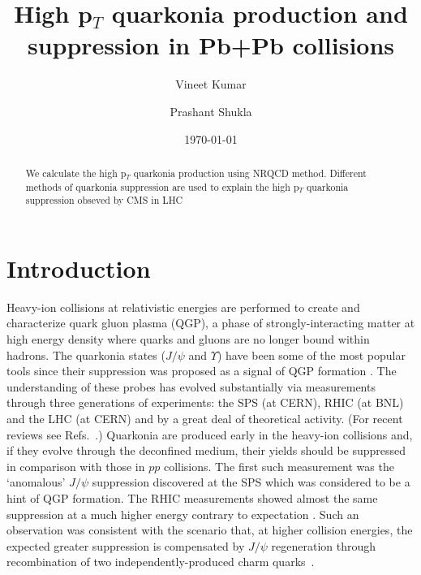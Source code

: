 \documentclass[aps,prc,preprint,superscriptaddress,showpacs,showkeys]{revtex4-1}
\begin{document}
\newcommand{\Jpsi}{J/\psi}
\newcommand{\pT}{p_{T}}
\title{{\Large High p$_{T}$ quarkonia production and suppression in Pb+Pb collisions}} 
\author{\large Vineet Kumar}
\author{\large Prashant Shukla}

\date{\today}

\begin{abstract}
  We calculate the high p$_{T}$ quarkonia production using NRQCD method.
  Different methods of quarkonia suppression are used to explain the high
  p$_{T}$ quarkonia suppression obseved by CMS in LHC
\end{abstract}


\maketitle

\section{Introduction}
Heavy-ion collisions at relativistic energies are performed to create and characterize 
quark gluon plasma (QGP), a phase of strongly-interacting matter at high energy density 
where quarks and gluons are no longer bound within hadrons.
The quarkonia states ($\Jpsi$ and $\Upsilon$) have been some of the most popular tools 
since their suppression was proposed as a signal of QGP formation \cite{Matsui:1986dk}.
The understanding of these probes has evolved substantially via measurements 
through three generations of experiments: the SPS (at CERN), RHIC (at BNL) and the LHC (at CERN) 
and by a great deal of theoretical activity. (For recent reviews see 
Refs.~\cite{Schukraft:2013wba,Kluberg:2009wc,Brambilla:2010cs}.)
Quarkonia are produced early in the heavy-ion collisions and, if they evolve
through the deconfined medium, their yields should be suppressed in comparison with those in $pp$ collisions. 
The first such measurement was the `anomalous' $\Jpsi$ suppression discovered at the SPS 
which was considered to be a hint of QGP formation. The RHIC measurements showed almost the 
same suppression at a much higher energy contrary to expectation \cite{Brambilla:2010cs,Adare:2011yf}. 
Such an observation was consistent with the scenario that, at higher collision energies, the 
expected greater suppression is compensated by  $\Jpsi$ regeneration through recombination of two 
independently-produced charm quarks~\cite{Andronic:2003zv}. 
\end{document}
